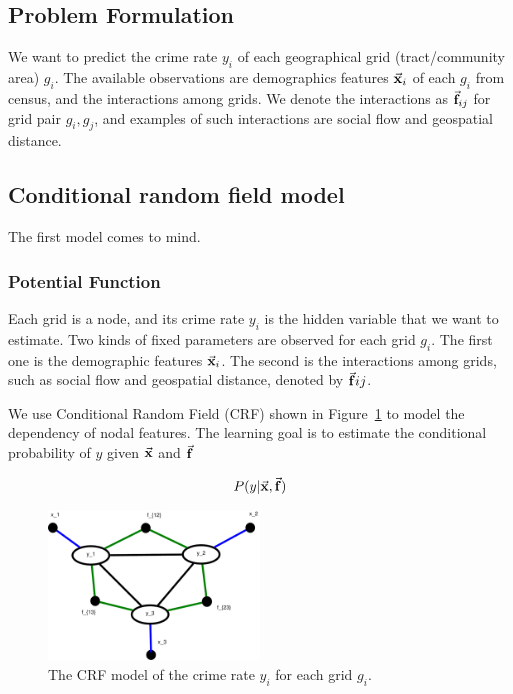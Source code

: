 \subsection{Problem Formulation}

We want to predict the crime rate $y_i$ of each geographical grid (tract/community area) $g_i$. The available observations are demographics features $\vec{\mathbf{x}}_i$ of each $g_i$ from census, and the interactions among grids. We denote the interactions as $\vec{\mathbf{f}}_{ij}$ for grid pair $g_i, g_j$, and examples of such interactions are social flow and geospatial distance.

\subsection{Conditional random field model}
The first model comes to mind.

\subsubsection{Potential Function}
Each grid is a node, and its crime rate $y_i$ is the hidden variable that we want to estimate. Two kinds of fixed parameters are observed for each grid $g_i$. The first one is the demographic features $\vec{\mathbf{x}}_i$. The second is the interactions among grids, such as social flow and geospatial distance, denoted by $\vec{\mathbf{f}}{ij}$.

We use Conditional Random Field (CRF) shown in Figure~\ref{fig:crf} to model the dependency of nodal features. The learning goal is to estimate the conditional probability of $y$ given $\vec{\mathbf{x}}$ and $\vec{\mathbf{f}}$

\begin{equation}
	P(y |  \vec{\mathbf{x}}, \vec{\mathbf{f}}) 
\end{equation}


\begin{figure}[hb]
	\centering
	\includegraphics[width=0.5\textwidth]{fig/CRF-fig.pdf}
	\caption{The CRF model of the crime rate $y_i$ for each grid $g_i$.}
	\label{fig:crf}
\end{figure}



